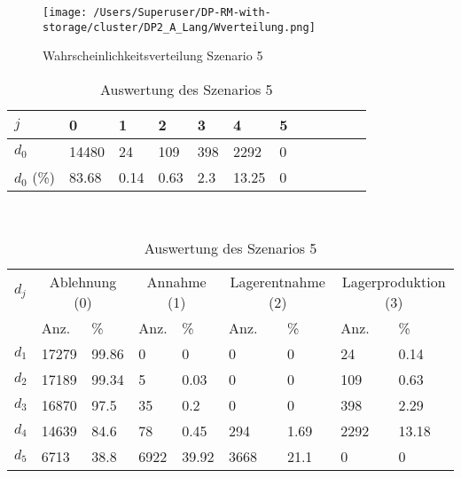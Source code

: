 \begin{figure}[h!]
  \begin{center}
    \texttt{[image: /Users/Superuser/DP-RM-with-storage/cluster/DP2\_A\_Lang/Wverteilung.png]}
    \caption{Wahrscheinlichkeitsverteilung Szenario 5}  \label{SB5}
  \end{center}
\end{figure}

\begin{table}[h!]
\renewcommand{\arraystretch}{1.5}
  \begin{center}
    \caption{Auswertung des Szenarios 5}  \label{AS5}
    \vspace*{3mm}
    \begin{tabular}{l l l l l l l l l l l l }  \hline 
         $j$ & 0 & 1  & 2 & 3 & 4  & 5   \\  \hline
$d_{0}$ &  14480 &    24 &   109 &  398 &   2292 &  0 \\
$d_{0}$ (\%) &  83.68 &  0.14 &  0.63 &  2.3 &  13.25 &  0 \\
\hline
    \end{tabular} \\[3mm]
        \begin{tabular}{ l l l l l l l l l}   \hline    %
    $d_j$ & \multicolumn{2}{c}{Ablehnung (0)} & \multicolumn{2}{c}{Annahme (1)}  & \multicolumn{2}{c}{Lagerentnahme (2)} & \multicolumn{2}{c}{Lagerproduktion (3)}\\
    & Anz. & \% & Anz. & \% & Anz. & \% & Anz. & \% \\ \hline 
$d_{1}$ &  17279 &  99.86 &   0 &    0 &   0 &   0 &    24 &   0.14 \\
$d_{2}$ &  17189 &  99.34 &     5 &   0.03 &   0 &   0 &   109 &   0.63 \\
$d_{3}$ &  16870 &   97.5 &    35 &    0.2 &   0 &   0 &   398 &   2.29 \\
$d_{4}$ &  14639 &   84.6 &    78 &   0.45 &   294 &  1.69 &  2292 &  13.18 \\
$d_{5}$ &   6713 &   38.8 &  6922 &  39.92 &  3668 &  21.1 &   0 &    0 \\
          \hline
   \end{tabular} \\[3mm]
     \end{center}
\end{table}

